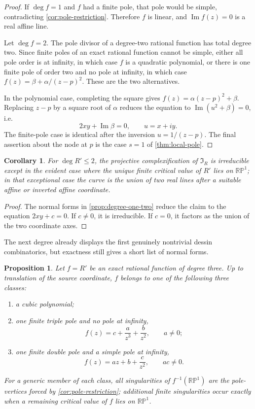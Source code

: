 \documentclass[11pt,reqno]{amsart}
\newtheorem{proposition}[theorem]{Proposition}
\newtheorem{corollary}[theorem]{Corollary}
\theoremstyle{definition}
\theoremstyle{remark}
\newcommand{\RP}{\mathbb {RP}}
\newcommand{\I}{\mathfrak I}
\renewcommand{\Im}{\operatorname{Im}}
\begin{document}
\begin{proof}
If $\deg f=1$ and $f$ had a finite pole, that pole would be simple, contradicting \cref{cor:pole-restriction}.  Therefore $f$ is linear, and $\Im f(z)=0$ is a real affine line.

Let $\deg f=2$.  The pole divisor of a degree-two rational function has total degree two.  Since finite poles of an exact rational function cannot be simple, either all pole order is at infinity, in which case $f$ is a quadratic polynomial, or there is one finite pole of order two and no pole at infinity, in which case $f(z)=\beta+\alpha/(z-p)^2$.  These are the two alternatives.

In the polynomial case, completing the square gives $f(z)=\alpha(z-p)^2+\beta$.  Replacing $z-p$ by a square root of $\alpha$ reduces the equation to $\Im(u^2+\beta)=0$, i.e.
\[
        2xy+\Im\beta=0,
        \qquad u=x+iy.
\]
The finite-pole case is identical after the inversion $u=1/(z-p)$.  The final assertion about the node at $p$ is the case $s=1$ of \cref{thm:local-pole}.
\end{proof}

\begin{corollary}\label{cor:degree-two-irreducible}
For $\deg R'\le2$, the projective complexification of $\I_R$ is irreducible except in the evident case where the unique finite critical value of $R'$ lies on $\RP^1$; in that exceptional case the curve is the union of two real lines after a suitable affine or inverted affine coordinate.
\end{corollary}

\begin{proof}
The normal forms in \cref{prop:degree-one-two} reduce the claim to the equation $2xy+c=0$.  If $c\ne0$, it is irreducible.  If $c=0$, it factors as the union of the two coordinate axes.
\end{proof}

The next degree already displays the first genuinely nontrivial dessin combinatorics, but exactness still gives a short list of normal forms.

\begin{proposition}\label{prop:degree-three-normal-forms}
Let $f=R'$ be an exact rational function of degree three.  Up to translation of the source coordinate, $f$ belongs to one of the following three classes:
\begin{enumerate}[label=(\roman*)]
\item a cubic polynomial;
\item one finite triple pole and no pole at infinity,
\[
        f(z)=c+\frac{a}{z^3}+\frac{b}{z^2},
        \qquad a\ne0;
\]
\item one finite double pole and a simple pole at infinity,
\[
        f(z)=az+b+\frac{c}{z^2},
        \qquad ac\ne0.
\]
\end{enumerate}
For a generic member of each class, all singularities of $f^{-1}(\RP^1)$ are the pole-vertices forced by \cref{cor:pole-restriction}; additional finite singularities occur exactly when a remaining critical value of $f$ lies on $\RP^1$.
\end{proposition}
\end{document}
